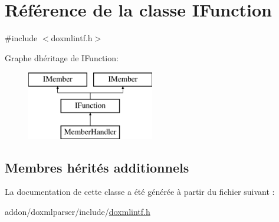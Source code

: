 \hypertarget{class_i_function}{}\section{Référence de la classe I\+Function}
\label{class_i_function}


{\ttfamily \#include $<$doxmlintf.\+h$>$}

Graphe d\textquotesingle{}héritage de I\+Function\+:\begin{figure}[H]
\begin{center}
\leavevmode
\includegraphics[height=3.000000cm]{class_i_function}
\end{center}
\end{figure}
\subsection*{Membres hérités additionnels}


La documentation de cette classe a été générée à partir du fichier suivant \+:\begin{DoxyCompactItemize}
\item 
addon/doxmlparser/include/\hyperlink{include_2doxmlintf_8h}{doxmlintf.\+h}\end{DoxyCompactItemize}
